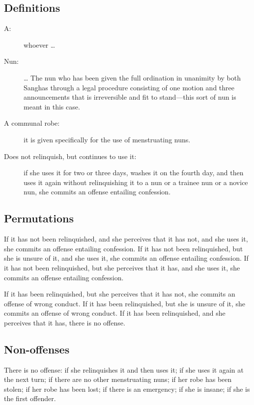 \documentclass[12pt,openany]{book}%
\begin{document}
\subsection*{Definitions }

\begin{description}%
\item[A: ] whoever … %
\item[Nun: ] … The nun who has been given the full ordination in unanimity by both Sanghas through a legal procedure consisting of one motion and three announcements that is irreversible and fit to stand—this sort of nun is meant in this case. %
\item[A communal robe: ] it is given specifically for the use of menstruating nuns. %
\item[Does not relinquish, but continues to use it: ] if she uses it for two or three days, washes it on the fourth day, and then uses it again without relinquishing it to a nun or a trainee nun or a novice nun, she commits an offense entailing confession. %
\end{description}

\subsection*{Permutations }

If it has not been relinquished, and she perceives that it has not, and she uses it, she commits an offense entailing confession. If it has not been relinquished, but she is unsure of it, and she uses it, she commits an offense entailing confession. If it has not been relinquished, but she perceives that it has, and she uses it, she commits an offense entailing confession. 

If it has been relinquished, but she perceives that it has not, she commits an offense of wrong conduct. If it has been relinquished, but she is unsure of it, she commits an offense of wrong conduct. If it has been relinquished, and she perceives that it has, there is no offense. 

\subsection*{Non-offenses }

There is no offense: if she relinquishes it and then uses it;  if she uses it again at the next turn;  if there are no other menstruating nuns;  if her robe has been stolen;  if her robe has been lost;  if there is an emergency;  if she is insane;  if she is the first offender. 
\end{document}
